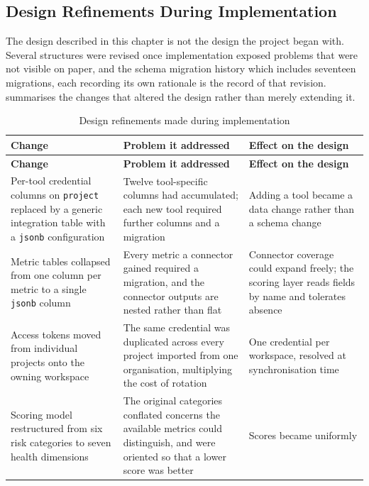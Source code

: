 \subsection{Design Refinements During Implementation}
\label{subsec:design-refinement}

The design described in this chapter is not the design the project began with.
Several structures were revised once implementation exposed problems that were
not visible on paper, and the schema migration history which includes seventeen migrations,
each recording its own rationale is the record of that revision.
 summarises the changes that altered the design rather than
merely extending it.

\begin{longtable}{
  >{\raggedright\arraybackslash}p{}
  >{\raggedright\arraybackslash}p{}
  >{\raggedright\arraybackslash}p{}
}
\caption{Design refinements made during implementation}
\label{tab:refinements}\\
\toprule
\textbf{Change} & \textbf{Problem it addressed} & \textbf{Effect on the design} \\
\midrule
\endfirsthead
\toprule
\textbf{Change} & \textbf{Problem it addressed} & \textbf{Effect on the design} \\
\midrule
\endhead
\bottomrule
\endlastfoot
Per-tool credential columns on \texttt{project} replaced by a generic integration
table with a \texttt{jsonb} configuration & Twelve tool-specific columns had
accumulated; each new tool required further columns and a migration & Adding a tool
became a data change rather than a schema change \\
\addlinespace
Metric tables collapsed from one column per metric to a single \texttt{jsonb} column
& Every metric a connector gained required a migration, and the connector outputs are
nested rather than flat & Connector coverage could expand freely; the scoring layer
reads fields by name and tolerates absence \\
\addlinespace
Access tokens moved from individual projects onto the owning workspace & The same
credential was duplicated across every project imported from one organisation,
multiplying the cost of rotation & One credential per workspace, resolved at
synchronisation time \\
\addlinespace
Scoring model restructured from six risk categories to seven health dimensions & The
original categories conflated concerns the available metrics could distinguish, and
were oriented so that a lower score was better & Scores became uniformly

\end{longtable}
